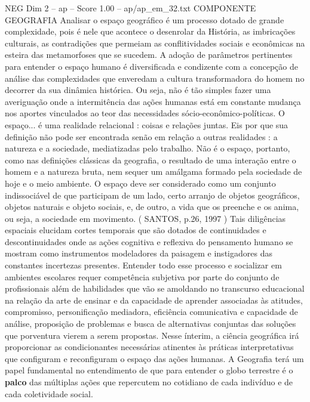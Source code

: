 \begin{textsample}{NEG Dim 2 – ap – Score 1.00 – ap/ap\_em\_32.txt}  \label{ex:f2_neg_149}
COMPONENTE GEOGRAFIA Analisar o espaço geográfico é um processo dotado de grande complexidade, pois é nele que acontece o desenrolar da História, as imbricações culturais, as contradições que permeiam as conflitividades sociais e econômicas na esteira das metamorfoses que se sucedem.
A adoção de parâmetros pertinentes para entender o espaço humano é diversificada e condizente com a concepção de análise das complexidades que enveredam a cultura transformadora do homem no decorrer da sua dinâmica histórica.
Ou seja, não é tão simples fazer uma averiguação onde a intermitência das ações humanas está em constante mudança nos aportes vinculados ao teor das necessidades sócio-econômico-políticas.
O espaço... é uma realidade relacional : coisas e relações juntas.
Eis por que sua definição não pode ser encontrada senão em relação a outras realidades : a natureza e a sociedade, mediatizadas pelo trabalho.
Não é o espaço, portanto, como nas definições clássicas da geografia, o resultado de uma interação entre o homem e a natureza bruta, nem sequer um amálgama formado pela sociedade de hoje e o meio ambiente.
O espaço deve ser considerado como um conjunto indissociável de que participam de um lado, certo arranjo de objetos geográficos, objetos naturais e objeto sociais, e, de outro, a vida que os preenche e os anima, ou seja, a sociedade em movimento. ( SANTOS, p.26, 1997 ) Tais diligências espaciais elucidam cortes temporais que são dotados de continuidades e descontinuidades onde as ações cognitiva e reflexiva do pensamento humano se mostram como instrumentos modeladores da paisagem e instigadores das constantes incertezas presentes.
Entender todo esse processo e socializar em ambientes escolares requer competência subjetiva por parte do conjunto de profissionais além de habilidades que vão se amoldando no transcurso educacional na relação da arte de ensinar e da capacidade de aprender associadas às atitudes, compromisso, personificação mediadora, eficiência comunicativa e capacidade de análise, proposição de problemas e busca de alternativas conjuntas das soluções que porventura vierem a serem propostas.
Nesse ínterim, a ciência geográfica irá proporcionar as condicionantes necessárias atinentes às práticas interpretativas que configuram e reconfiguram o espaço das ações humanas.
A Geografia terá um papel fundamental no entendimento de que para entender o globo terrestre é o \textbf{palco} das múltiplas ações que repercutem no cotidiano de cada indivíduo e de cada coletividade social.

\end{textsample}
